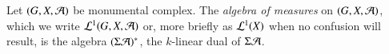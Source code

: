 \begin{definition}
Let $(G, X, \mathcal{A})$ be monumental complex. The \textit{algebra of measures} on $(G, X, \mathcal{A})$, which we write $\mathcal{L}^{1}(G, X, \mathcal{A})$ or, more briefly as $\mathcal{L}^{1}(X)$ when no confusion will result, is the algebra $(\Sigma \mathcal{A})^{*}$, the $k$-linear dual of $\Sigma\mathcal{A}$. 
\end{definition}
 
